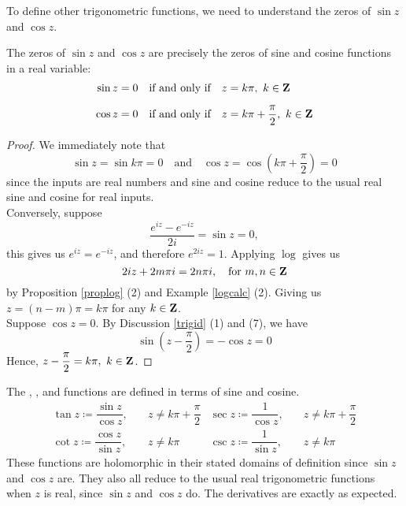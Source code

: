 \medskip

To define other trigonometric functions, we need to understand the zeros of $\sin z$ and $\cos z$.
\begin{theorem}
The zeros of $\sin z$ and $\cos z$ are precisely the zeros of sine and cosine functions in a real variable:
\begin{align*}
\sin z = 0 \quad \text{if and only if} &\quad z = k\pi,\ k \in \mathbf Z\\[0.5em]
\cos z = 0 \quad \text{if and only if} &\quad z = k\pi + \dfrac{\pi}{2},\ k \in \mathbf Z
\end{align*}
\end{theorem}
\begin{proof}
We immediately note that
\[\sin z = \sin k\pi = 0 \quad \text{and} \quad \cos z = \cos\left(k\pi + \dfrac{\pi}{2}\right) = 0\]
since the inputs are real numbers and sine and cosine reduce to the usual real sine and cosine for real inputs.\\[1em]
Conversely, suppose
\[\frac{e^{iz} - e^{-iz}}{2i} = \sin z = 0,\]
this gives us $e^{iz} = e^{-iz}$, and therefore $e^{2iz} = 1$. Applying $\log$ gives us
\[2iz + 2m\pi i = 2n\pi i,\quad \text{for } m,n \in \mathbf Z\]
by Proposition \ref{proplog} (2) and Example \ref{logcalc} (2). Giving us $z = (n-m)\pi = k\pi$ for any $k\in \mathbf Z$.\\[1em]
Suppose $\cos z = 0$. By Discussion \ref{trigid} (1) and (7), we have
\[\sin\left(z - \frac{\pi}{2}\right) = -\cos z = 0\]
Hence, $z - \dfrac{\pi}{2} = k\pi,\ k \in \mathbf Z$.
\end{proof}

\medskip

\begin{definition}
The , ,  and  functions are defined in terms of sine and cosine.
\begin{align*}
\tan z \coloneqq \dfrac{\sin z}{\cos z},&\quad z \neq k\pi + \dfrac{\pi}{2} & \sec z \coloneqq \dfrac{1}{\cos z},&\quad z \neq k\pi + \dfrac{\pi}{2}\\[1em]
\cot z \coloneqq \dfrac{\cos z}{\sin z},&\quad z \neq k\pi & \csc z \coloneqq \dfrac{1}{\sin z},&\quad z \neq k\pi
\end{align*}
These functions are holomorphic in their stated domains of definition since $\sin z$ and $\cos z$ are. They also all reduce to the usual real trigonometric functions when $z$ is real, since $\sin z$ and $\cos z$ do. The derivatives are exactly as expected.
\end{definition}